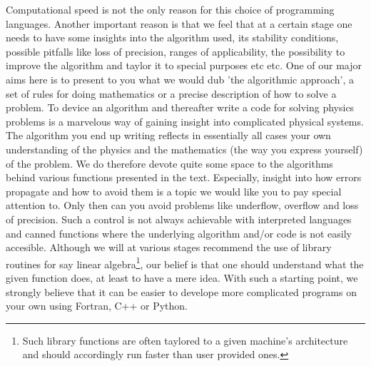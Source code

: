 Computational speed is not the only reason for this choice of
programming languages. Another important reason is that we feel that
at a certain stage one needs to have some insights into the algorithm
used, its stability conditions, possible pitfalls like loss of
precision, ranges of applicability, the possibility to improve the
algorithm and taylor it to special purposes etc etc.  One of our major
aims here is to present to you what we would dub 'the algorithmic
approach', a set of rules for doing mathematics or a precise
description of how to solve a problem. To device an algorithm and
thereafter write a code for solving physics problems is a marvelous
way of gaining insight into complicated physical systems. The
algorithm you end up writing reflects in essentially all cases your
own understanding of the physics and the mathematics (the way you
express yourself) of the problem.  We do therefore devote quite some
space to the algorithms behind various functions presented in the
text. Especially, insight into how errors propagate and how to avoid
them is a topic we would like you to pay special attention to. Only
then can you avoid problems like underflow, overflow and loss of
precision. Such a control is not always achievable with interpreted
languages and canned functions where the underlying algorithm and/or
code is not easily accesible.  Although we will at various stages
recommend the use of library routines for say linear
algebra\footnote{Such library functions are often taylored to a given
machine's architecture and should accordingly run faster than user
provided ones.}, our belief is that one should understand what the
given function does, at least to have a mere idea.  With such a
starting point, we strongly believe that it can be easier to develope
more complicated programs on your own using Fortran, C++ or Python.

